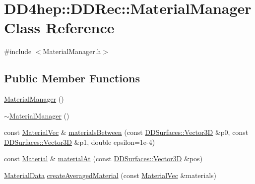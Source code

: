 \hypertarget{class_d_d4hep_1_1_d_d_rec_1_1_material_manager}{
\section{DD4hep::DDRec::MaterialManager Class Reference}
\label{class_d_d4hep_1_1_d_d_rec_1_1_material_manager}
}


{\ttfamily \#include $<$MaterialManager.h$>$}\subsection*{Public Member Functions}
\begin{DoxyCompactItemize}
\item 
\hyperlink{class_d_d4hep_1_1_d_d_rec_1_1_material_manager_a7f32a7b551449b6143f56ba4a3f90c18}{MaterialManager} ()
\item 
\hyperlink{class_d_d4hep_1_1_d_d_rec_1_1_material_manager_a0251231cf063ba1b449c858b4b3a00a6}{$\sim$MaterialManager} ()
\item 
const \hyperlink{namespace_d_d4hep_1_1_d_d_rec_a69fdab2f851316d2b9e50956920359f7}{MaterialVec} \& \hyperlink{class_d_d4hep_1_1_d_d_rec_1_1_material_manager_a9e975753f152c9deb9c490e9222606c1}{materialsBetween} (const \hyperlink{class_d_d_surfaces_1_1_vector3_d}{DDSurfaces::Vector3D} \&p0, const \hyperlink{class_d_d_surfaces_1_1_vector3_d}{DDSurfaces::Vector3D} \&p1, double epsilon=1e-\/4)
\item 
const \hyperlink{class_d_d4hep_1_1_geometry_1_1_material}{Material} \& \hyperlink{class_d_d4hep_1_1_d_d_rec_1_1_material_manager_a230252814cc77e7d7e718783d376f41f}{materialAt} (const \hyperlink{class_d_d_surfaces_1_1_vector3_d}{DDSurfaces::Vector3D} \&pos)
\item 
\hyperlink{class_d_d4hep_1_1_d_d_rec_1_1_material_data}{MaterialData} \hyperlink{class_d_d4hep_1_1_d_d_rec_1_1_material_manager_a44243f88b984a698c8b823885c439702}{createAveragedMaterial} (const \hyperlink{namespace_d_d4hep_1_1_d_d_rec_a69fdab2f851316d2b9e50956920359f7}{MaterialVec} \&materials)
\end{DoxyCompactItemize}
